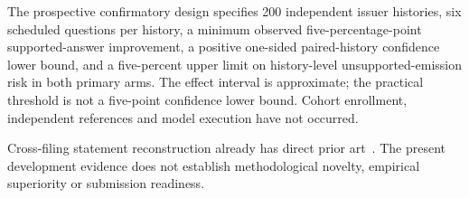The prospective confirmatory design specifies 200 independent issuer histories,
six scheduled questions per history, a minimum observed five-percentage-point
supported-answer improvement, a positive one-sided paired-history confidence
lower bound, and a five-percent upper limit on history-level unsupported-emission
risk in both primary arms. The effect interval is approximate; the practical
threshold is not a five-point confidence lower bound. Cohort enrollment,
independent references and model execution have not occurred.

Cross-filing statement reconstruction already has direct prior
art~\cite{martin2026reclassified}. The present development evidence does not
establish methodological novelty, empirical superiority or submission readiness.
